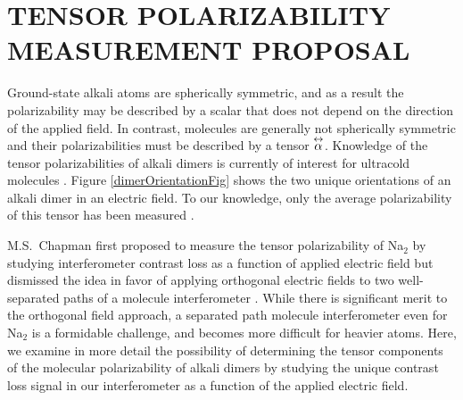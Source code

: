 \chapter{TENSOR POLARIZABILITY MEASUREMENT PROPOSAL}
\label{dimersChapter}



Ground-state alkali atoms are spherically symmetric, and as a result the polarizability may be described by a scalar that does not depend on the direction of the applied field. In contrast, molecules are generally not spherically symmetric and their polarizabilities must be described by a tensor $\overset{\leftrightarrow}{\alpha}$. Knowledge of the tensor polarizabilities of alkali dimers is currently of interest for ultracold molecules \cite{Dei08a}. Figure \ref{dimerOrientationFig} shows the two unique orientations of an alkali dimer in an electric field. To our knowledge, only the average polarizability of this tensor has been measured \cite{Tar93,Mol74}. 

M.S.~Chapman first proposed to measure the tensor polarizability of Na$_2$ by studying interferometer contrast loss as a function of applied electric field but dismissed the idea in favor of applying orthogonal electric fields to two well-separated paths of a molecule interferometer \cite{Cha95Thesis}. While there is significant merit to the orthogonal field approach, a separated path molecule interferometer even for Na$_2$ is a formidable challenge, and becomes more difficult for heavier atoms. Here, we examine in more detail the possibility of determining the tensor components of the molecular polarizability of alkali dimers by studying the unique contrast loss signal in our interferometer as a function of the applied electric field. 

